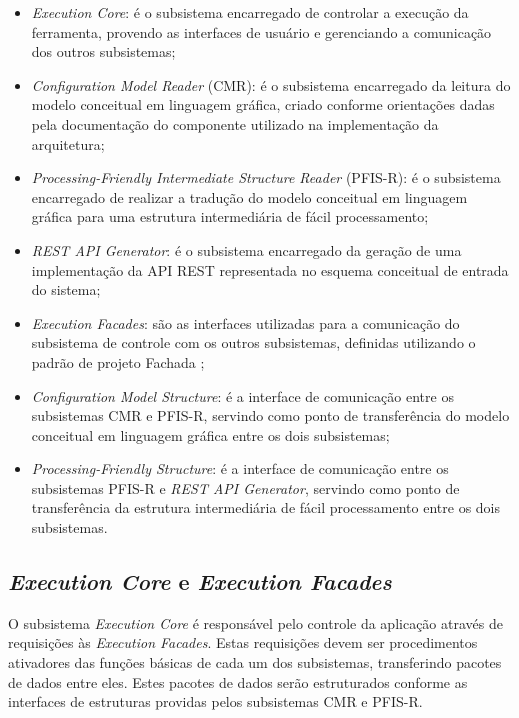 \begin{itemize}
    \item \textit{Execution Core}: é o subsistema encarregado de controlar a execução da ferramenta, provendo as interfaces de usuário e gerenciando a comunicação dos outros subsistemas;
    \item \textit{Configuration Model Reader} (CMR): é o subsistema encarregado da leitura do modelo conceitual em linguagem gráfica, criado conforme orientações dadas pela documentação do componente utilizado na implementação da arquitetura;
    \item \textit{Processing-Friendly Intermediate Structure Reader} (PFIS-R): é o subsistema encarregado de realizar a tradução do modelo conceitual em linguagem gráfica para uma estrutura intermediária de fácil processamento;
    \item \textit{REST API Generator}: é o subsistema encarregado da geração de uma implementação da API REST representada no esquema conceitual de entrada do sistema;
    \item \textit{Execution Facades}: são as interfaces utilizadas para a comunicação do subsistema de controle com os outros subsistemas, definidas utilizando o padrão de projeto Fachada \cite{GAMMA:1995};
    \item \textit{Configuration Model Structure}: é a interface de comunicação entre os subsistemas CMR e PFIS-R, servindo como ponto de transferência do modelo conceitual em linguagem gráfica entre os dois subsistemas;
    \item \textit{Processing-Friendly Structure}: é a interface de comunicação entre os subsistemas PFIS-R e \textit{REST API Generator}, servindo como ponto de transferência da estrutura intermediária de fácil processamento entre os dois subsistemas.
\end{itemize}


\subsection{\textit{Execution Core} e \textit{Execution Facades}}

O subsistema \textit{Execution Core} é responsável pelo controle da aplicação através de requisições às \textit{Execution Facades}. Estas requisições devem ser procedimentos ativadores das funções básicas de cada um dos subsistemas, transferindo pacotes de dados entre eles. Estes pacotes de dados serão estruturados conforme as interfaces de estruturas providas pelos subsistemas CMR e PFIS-R.

